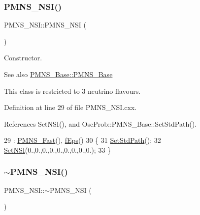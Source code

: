 \subsubsection{\texorpdfstring{P\+M\+N\+S\+\_\+\+N\+S\+I()}{PMNS\_NSI()}}
{\footnotesize\ttfamily P\+M\+N\+S\+\_\+\+N\+S\+I\+::\+P\+M\+N\+S\+\_\+\+N\+SI (\begin{DoxyParamCaption}{ }\end{DoxyParamCaption})}

Constructor. \begin{DoxySeeAlso}{See also}
\hyperlink{classOscProb_1_1PMNS__Base_aa53e83b03a9cf4bdfa0a07136bd17a79}{P\+M\+N\+S\+\_\+\+Base\+::\+P\+M\+N\+S\+\_\+\+Base}
\end{DoxySeeAlso}
This class is restricted to 3 neutrino flavours. 

Definition at line 29 of file P\+M\+N\+S\+\_\+\+N\+S\+I.\+cxx.



References Set\+N\+S\+I(), and Osc\+Prob\+::\+P\+M\+N\+S\+\_\+\+Base\+::\+Set\+Std\+Path().


\begin{DoxyCode}
29                    : \hyperlink{classOscProb_1_1PMNS__Fast_a2bbac744bf63753105d766a860af7c0d}{PMNS\_Fast}(), \hyperlink{classOscProb_1_1PMNS__NSI_a7e2f0a3fdc633f68523c9de0ce76e67d}{fEps}()
30 \{
31   \hyperlink{classOscProb_1_1PMNS__Base_add6533a9fc9acdfc7ae258b62570d78d}{SetStdPath}();
32   \hyperlink{classOscProb_1_1PMNS__NSI_ae8829af10bc4051e8c74c8b1bc81c88c}{SetNSI}(0.,0.,0.,0.,0.,0.,0.,0.,0.);
33 \}
\end{DoxyCode}
\mbox{\label{classOscProb_1_1PMNS__NSI_aad1035cb0fb26994029c25b475ec3bde}} 
\subsubsection{\texorpdfstring{$\sim$\+P\+M\+N\+S\+\_\+\+N\+S\+I()}{~PMNS\_NSI()}}
{\footnotesize\ttfamily P\+M\+N\+S\+\_\+\+N\+S\+I\+::$\sim$\+P\+M\+N\+S\+\_\+\+N\+SI (\begin{DoxyParamCaption}{ }\end{DoxyParamCaption})\hspace{0.3cm}{\ttfamily [virtual]}}

